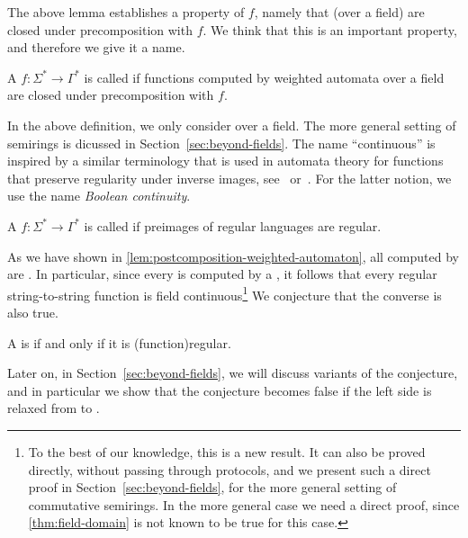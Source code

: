 The above lemma establishes a property of $f$, namely that 
(over a field) are closed under precomposition with $f$. We think that this is
an important property, and therefore we give it a name.

\begin{definition}
    \label{def:weighted-continuity}
    \AP
    A  $f : \Sigma^* \to \Gamma^*$ is called
     if functions computed by weighted automata over a
    field are closed under precomposition with $f$.
\end{definition}

In the above definition, we only consider  over a field. The
more general setting of semirings is dicussed in
Section~\ref{sec:beyond-fields}. The name ``continuous'' is inspired by a
similar terminology that is used in automata theory for functions that preserve
regularity under inverse images, see~\cite[Theorem 4.1]{PinSilva05}
or~\cite[Footnote 2]{continuity20}. For the latter notion, we use the name
\emph{Boolean continuity}.

\begin{definition}
  \AP
  A  $f : \Sigma^* \to \Gamma^*$ is called
   if preimages of regular languages are regular.
\end{definition}

As we have shown in \cref{lem:postcomposition-weighted-automaton}, all
 computed by  are . In
particular, since every  is computed by a
, it follows that every regular string-to-string function is field
continuous\footnote{To the best of our knowledge, this is a new result. It can
also be proved directly, without passing through protocols, and we present such
a direct proof in Section~\ref{sec:beyond-fields}, for the more general setting
of commutative semirings. In the more general case we need a direct proof,
since \cref{thm:field-domain} is not known to be true for this case.} We
conjecture that the converse is also true.

\begin{conjecture}\label{conj:regular-continuous}
  A  is  if and only if it is 
  \kl(function){regular}.
\end{conjecture}

Later on, in Section~\ref{sec:beyond-fields}, we will discuss variants of the
conjecture, and in particular we show that the conjecture becomes false if the
left side is relaxed from  to .

